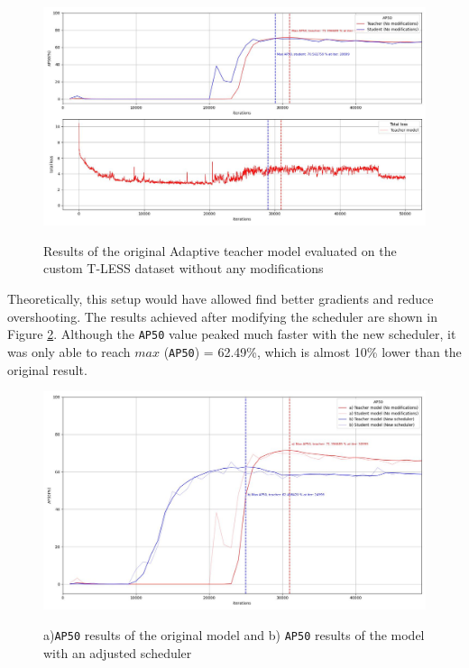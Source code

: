 \documentclass[english, 12pt, a4paper, elec, utf8, a-1b, online]{aaltothesis}
\begin{document}
\begin{figure}[htb]
	\begin{center}
		\includegraphics[width=16cm]{./loss&AP50_original.jpg}
	\end{center}
	\caption{Results of the original Adaptive teacher model evaluated on the custom T-LESS dataset without any modifications}
	\begin{center}
		\label{original_experiment}
	\end{center}
\end{figure}
\FloatBarrier
Theoretically, this setup would have allowed find better gradients and reduce overshooting. The results achieved after modifying the scheduler are shown in Figure \ref{comparison_1}. Although the \texttt{AP50} value peaked much faster with the new scheduler, it was only able to reach $max$ (\texttt{AP50}) = 62.49\%, which is almost 10\% lower than the original result.    



\begin{figure}[htb]
	\begin{center}
		\includegraphics[width=14cm]{./AP50_scheduler.jpg}
	\end{center}
	\caption{a)\texttt{AP50} results of the original model and b) \texttt{AP50} results of the model with an adjusted scheduler}
	\begin{center}
		\label{comparison_1}
	\end{center}
\end{figure}
\FloatBarrier
\end{document}
